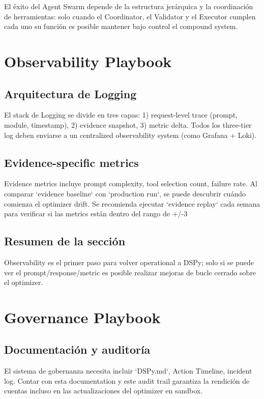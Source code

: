 \documentclass[a4paper]{article}
\begin{document}
El éxito del Agent Swarm depende de la estructura jerárquica y la coordinación de herramientas: solo cuando el Coordinator, el Validator y el Executor cumplen cada uno su función es posible mantener bajo control el compound system.

\section{Observability Playbook}

\subsection{Arquitectura de Logging}

El stack de Logging se divide en tres capas: 1) request-level trace (prompt, module, timestamp), 2) evidence snapshot, 3) metric delta. Todos los three-tier log deben enviarse a un centralized observability system (como Grafana + Loki).

\subsection{Evidence-specific metrics}

Evidence metrics incluye prompt complexity, tool selection count, failure rate. Al comparar `evidence baseline` con `production run`, se puede descubrir cuándo comienza el optimizer drift. Se recomienda ejecutar `evidence replay` cada semana para verificar si las metrics están dentro del rango de +/-3%

\subsection{Resumen de la sección}

Observability es el primer paso para volver operational a DSPy; solo si se puede ver el prompt/response/metric es posible realizar mejoras de bucle cerrado sobre el optimizer.

\section{Governance Playbook}

\subsection{Documentación y auditoría}

El sistema de gobernanza necesita incluir `DSPy.md`, Action Timeline, incident log. Contar con esta documentation y este audit trail garantiza la rendición de cuentas incluso en las actualizaciones del optimizer en sandbox.
\end{document}
